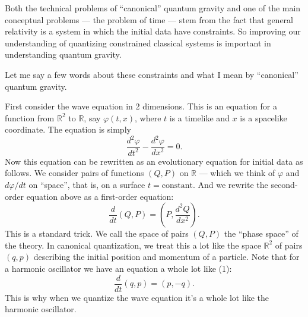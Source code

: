 \documentclass{article}
\begin{document}
Both the technical problems of ``canonical'' quantum gravity and one of
the main conceptual problems --- the problem of time --- stem from the
fact that general relativity is a system in which the initial data have
constraints. So improving our understanding of quantizing constrained
classical systems is important in understanding quantum gravity.

Let me say a few words about these constraints and what I mean by
``canonical'' quantum gravity.

First consider the wave equation in 2 dimensions. This is an equation
for a function from \(\mathbb{R}^2\) to \(\mathbb{R}\), say
\(\varphi(t,x)\), where \(t\) is a timelike and \(x\) is a spacelike
coordinate. The equation is simply
\[\frac{d^2\varphi}{dt^2} -\frac{d^2\varphi}{dx^2} = 0.\] Now this
equation can be rewritten as an evolutionary equation for initial data
as follows. We consider pairs of functions \((Q,P)\) on \(\mathbb{R}\)
--- which we think of \(\varphi\) and \(d\varphi/dt\) on ``space'', that
is, on a surface \(t = \text{constant}\). And we rewrite the
second-order equation above as a first-order equation:
\[\frac{d}{dt}(Q,P) = \left(P,\frac{d^2Q}{dx^2}\right).\tag{1}\] This is
a standard trick. We call the space of pairs \((Q,P)\) the ``phase
space'' of the theory. In canonical quantization, we treat this a lot
like the space \(\mathbb{R}^2\) of pairs \((q,p)\) describing the
initial position and momentum of a particle. Note that for a harmonic
oscillator we have an equation a whole lot like (1):
\[\frac{d}{dt}(q,p) = (p,-q).\] This is why when we quantize the wave
equation it's a whole lot like the harmonic oscillator.
\end{document}
